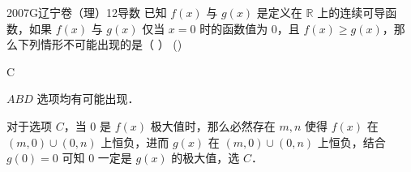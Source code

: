 
\begin{problem}{2007}{G}{辽宁卷（理）}{12}{导数}
已知 $ f(x) $ 与 $ g(x) $ 是定义在 $ \mathbb{R} $ 上的连续可导函数，如果 $ f(x) $ 与 $ g(x) $ 仅当 $ x=0 $ 时的函数值为 $ 0 $，且 $ f(x)\geq g(x) $，那么下列情形不可能出现的是（ ） (\hspace{1cm})
\begin{choices}
\end{choices}
\end{problem}

\begin{answer}
C
\end{answer}

\begin{solutions}
$ ABD $ 选项均有可能出现．

对于选项 $ C $，当 $ 0 $ 是 $ f(x) $ 极大值时，那么必然存在 $ m,n $ 使得 $ f(x) $ 在 $ (m,0)\cup(0,n) $ 上恒负，进而 $ g(x) $ 在 $ (m,0)\cup(0,n) $ 上恒负，结合 $ g(0)=0 $ 可知 $ 0 $ 一定是 $ g(x) $ 的极大值，选 $ C $．
\end{solutions}